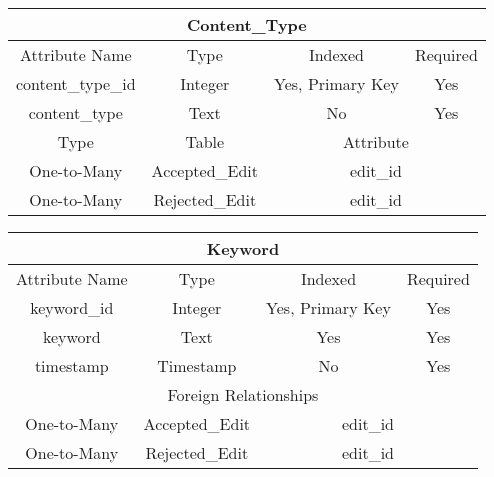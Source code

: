\documentclass[12pt,letterpaper]{article}
\begin{document}
\vspace*{.4cm}
\begin{center}
\label{ContentType}
\begin{tabular}{|c|c|c|c|}
\hline
\multicolumn{4}{|c|}{Content\_Type} \\ \hline
Attribute Name & Type & Indexed & Required \\ \hline
content\_type\_id & Integer & Yes, Primary Key & Yes \\ \hline
content\_type & Text & No & Yes \\ \hline
Type & Table & \multicolumn{2}{c|}{Attribute} \\ \hline
One-to-Many & Accepted\_Edit & \multicolumn{2}{c|}{edit\_id} \\ \hline %
One-to-Many & Rejected\_Edit & \multicolumn{2}{c|}{edit\_id} \\ \hline %
\end{tabular}
\end{center}


\vspace*{.4cm}
\begin{center}
\label{Keyword}
\begin{tabular}{|c|c|c|c|}
\hline
\multicolumn{4}{|c|}{Keyword} \\ \hline
Attribute Name & Type & Indexed & Required \\ \hline
keyword\_id & Integer & Yes, Primary Key & Yes \\ \hline
keyword & Text & Yes & Yes \\ \hline
timestamp & Timestamp & No & Yes \\ \hline
\multicolumn{4}{|c|}{Foreign Relationships} \\ \hline
One-to-Many & Accepted\_Edit & \multicolumn{2}{c|}{edit\_id} \\ \hline %
One-to-Many & Rejected\_Edit & \multicolumn{2}{c|}{edit\_id} \\ \hline %
\end{tabular}
\end{center}
\end{document}
